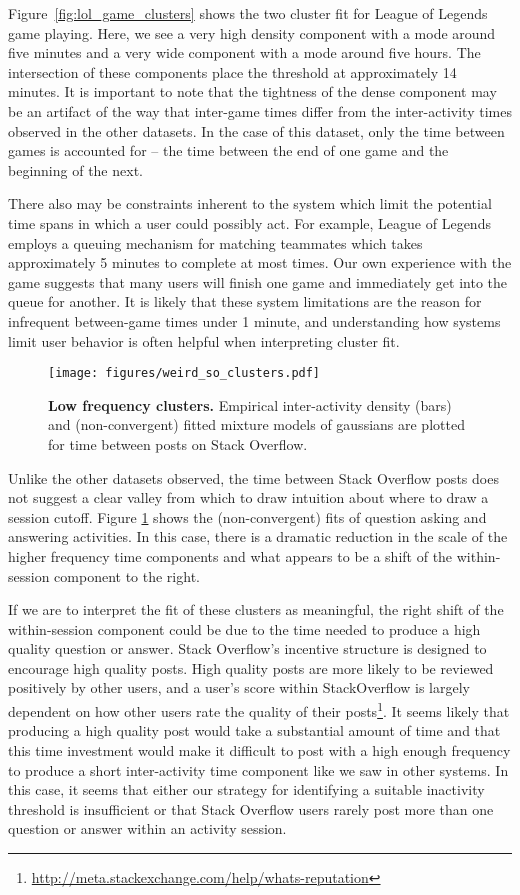 Figure~\ref{fig:lol_game_clusters} shows the two cluster fit for League of Legends game playing.  Here, we see a very high density component with a mode around five minutes and a very wide component with a mode around five hours.  The intersection of these components place the threshold at approximately 14 minutes.  It is important to note that the tightness of the dense component may be an artifact of the way that inter-game times differ from the inter-activity times observed in the other datasets.  In the case of this dataset, only the time between games is accounted for -- the time between the end of one game and the beginning of the next.

There also may be constraints inherent to the system which limit the potential time spans in which a user could possibly act.  For example, League of Legends employs a queuing mechanism for matching teammates which takes approximately 5 minutes to complete at most times.  Our own experience with the game suggests that many users will finish one game and immediately get into the queue for another.  It is likely that these system limitations are the reason for infrequent between-game times under 1 minute, and understanding how systems limit user behavior is often helpful when interpreting cluster fit.

\begin{figure}
\centering
\texttt{[image: figures/weird\_so\_clusters.pdf]}
\caption{
    \textbf{Low frequency clusters.} Empirical inter-activity density (bars) and (non-convergent) fitted mixture models of gaussians are plotted for time between posts on Stack Overflow.
}
\label{fig:stack_overflow_clusters}
\end{figure}
Unlike the other datasets observed, the time between Stack Overflow posts does not suggest a clear valley from which to draw intuition about where to draw a session cutoff.  Figure \ref{fig:stack_overflow_clusters} shows the (non-convergent) fits of question asking and answering activities.  In this case, there is a dramatic reduction in the scale of the higher frequency time components and what appears to be a shift of the within-session component to the right.

If we are to interpret the fit of these clusters as meaningful, the right shift of the within-session component could be due to the time needed to produce a high quality question or answer.  Stack Overflow's incentive structure is designed to encourage high quality posts.  High quality posts are more likely to be reviewed positively by other users, and a user's score within StackOverflow is largely dependent on how other users rate the quality of their posts\footnote{\url{http://meta.stackexchange.com/help/whats-reputation}}.  It seems likely that producing a high quality post would take a substantial amount of time and that this time investment would make it difficult to post with a high enough frequency to produce a short inter-activity time component like we saw in other systems.  In this case, it seems that either our strategy for identifying a suitable inactivity threshold is insufficient or that Stack Overflow users rarely post more than one question or answer within an activity session.
